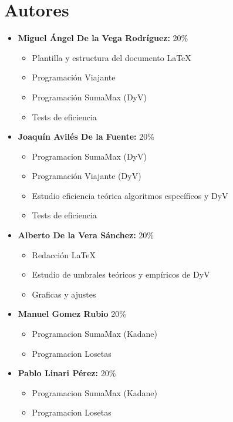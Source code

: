 \documentclass[11pt,openany]{book}
\begin{document}
\tableofcontents %
\newpage %


\chapter{Autores}
\begin{itemize}
      \item \textbf{Miguel Ángel De la Vega Rodríguez:} 20\%
            \begin{itemize}
                  \item Plantilla y estructura del documento \LaTeX
                  \item Programación Viajante
                  \item Programación SumaMax (DyV)
                  \item Tests de eficiencia
            \end{itemize}
      \item \textbf{Joaquín Avilés De la Fuente:} 20\%
            \begin{itemize}
                  \item Programacion SumaMax (DyV)
                  \item Programación Viajante (DyV)
                  \item Estudio eficiencia teórica algoritmos específicos y DyV
                  \item Tests de eficiencia
            \end{itemize}
      \item \textbf{Alberto De la Vera Sánchez: } 20\%
            \begin{itemize}
                  \item Redacción \LaTeX
                  \item Estudio de umbrales teóricos y empíricos de DyV
                  \item Graficas y ajustes
            \end{itemize}
      \item \textbf{Manuel Gomez Rubio} 20\%
            \begin{itemize}
                  \item Programacion SumaMax (Kadane)
                  \item Programacion Losetas 
            \end{itemize}
      \item \textbf{Pablo Linari Pérez:} 20\%
            \begin{itemize}
                  \item Programacion SumaMax (Kadane)
                  \item Programacion Losetas 
            \end{itemize}
\end{itemize}
\end{document}
